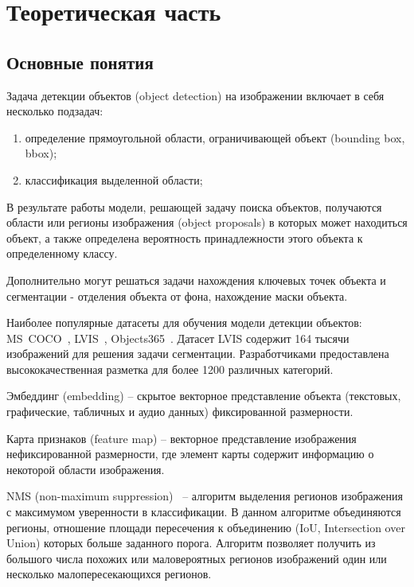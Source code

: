 \documentclass[a4paper,14pt]{article}
\begin{document}
    \section{Теоретическая часть}

    \subsection{Основные понятия}

    Задача детекции объектов (object detection) на изображении включает в себя несколько подзадач:
    \begin{enumerate}
        [1)]
        \itemsep0em
        \item определение прямоугольной области, ограничивающей объект (bounding box, bbox);
        \item классификация выделенной области;
    \end{enumerate}
    В результате работы модели, решающей задачу поиска объектов, получаются области или регионы изображения (object proposals) в которых может находиться объект, а также определена вероятность принадлежности этого объекта к определенному классу.

    Дополнительно могут решаться задачи нахождения ключевых точек объекта и сегментации - отделения объекта от фона, нахождение маски объекта.

    Наиболее популярные датасеты для обучения модели детекции объектов: MS~COCO~\cite{COCO}, LVIS~\cite{LVIS}, Objects365~\cite{Objects365}.
    Датасет LVIS содержит 164 тысячи изображений для решения задачи сегментации. Разработчиками предоставлена высококачественная разметка для более 1200 различных категорий.

    Эмбеддинг (embedding) -- скрытое векторное представление объекта (текстовых, графические, табличных и аудио данных) фиксированной размерности.

    Карта признаков (feature map) -- векторное представление изображения нефиксированной размерности, где элемент карты содержит информацию о некоторой области изображения.

    NMS (non-maximum suppression)~\cite{neubeck2006efficient} -- алгоритм выделения регионов изображения с максимумом уверенности в классификации.
    В данном алгоритме объединяются регионы, отношение площади пересечения к объединению (IoU, Intersection over Union) которых больше заданного порога.
    Алгоритм позволяет получить из большого числа похожих или маловероятных регионов изображений один или несколько малопересекающихся регионов.
\end{document}
